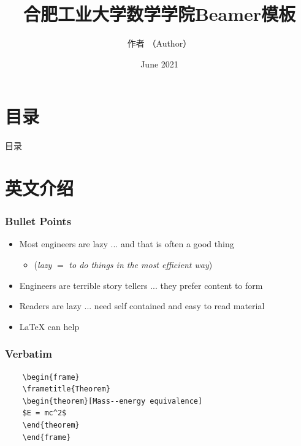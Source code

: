 \documentclass[aspectratio=169]{beamer}
\title{合肥工业大学数学学院Beamer模板}
\author[LaureatePoet]{作者  （Author）}
\institute{School of Mathematics, HFUT}
\date{June 2021}
\begin{document}
  
  \begin{frame}
    \maketitle
  \end{frame}

\section*{目录}
\begin{frame}{目录}
	\tableofcontents
\end{frame}


\section{英文介绍}
\begin{frame}
\frametitle{Bullet Points}
\vspace{-0.3cm}
\begin{itemize}[<+->]
	\item Most engineers are lazy ... and that is often a good thing
	\begin{itemize}
		\item (\textit{lazy} $=$ \textit{to do things in the most efficient way})
	\end{itemize}
	\item Engineers are terrible story tellers ... they prefer content to form
	\item Readers are lazy ... need self contained and easy to read material
	\item \LaTeX{} can help
\end{itemize}
\end{frame}

\begin{frame}[fragile] %
\frametitle{Verbatim}
\begin{example}
	\begin{verbatim}
	\begin{frame}
	\frametitle{Theorem}
	\begin{theorem}[Mass--energy equivalence]
	$E = mc^2$
	\end{theorem}
	\end{frame}\end{verbatim}
\end{example}
\end{frame}
\end{document}
